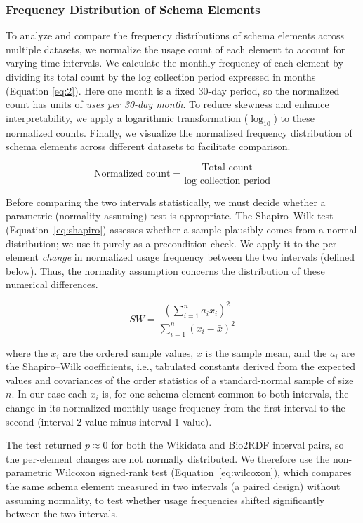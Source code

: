 \documentclass[sw]{iosart2x}
\begin{document}
\subsubsection{Frequency Distribution of Schema Elements}\label{sec:s61}
To analyze and compare the frequency distributions of schema elements across multiple datasets, we normalize the usage count of each element to account for varying time intervals. We calculate the monthly frequency of each element by dividing its total count by the log collection period expressed in months (Equation \ref{eq:2}). Here one month is a fixed 30-day period, so the normalized count has units of \emph{uses per 30-day month}. To reduce skewness and enhance interpretability, we apply a logarithmic transformation ($\log_{10}$) to these normalized counts. Finally, we visualize the normalized frequency distribution of schema elements across different datasets to facilitate comparison.

\begin{equation}
\text{Normalized count} = \frac{\text{Total count}}{\text{log collection period}}
\label{eq:2}
\end{equation}

Before comparing the two intervals statistically, we must decide whether a parametric (normality-assuming) test is appropriate. The Shapiro--Wilk test (Equation~\ref{eq:shapiro}) assesses whether a sample plausibly comes from a normal distribution; we use it purely as a precondition check. We apply it to the per-element \emph{change} in normalized usage frequency between the two intervals (defined below). Thus, the normality assumption concerns the distribution of these numerical differences.

\begin{equation}
SW = \frac{\left( \sum_{i=1}^n a_i x_i \right)^2}{\sum_{i=1}^n (x_i - \bar{x})^2}
\label{eq:shapiro}
\end{equation}

where the \( x_i \) are the ordered sample values, \( \bar{x} \) is the sample mean, and the \( a_i \) are the Shapiro--Wilk coefficients, i.e., tabulated constants derived from the expected values and covariances of the order statistics of a standard-normal sample of size \( n \). In our case each \( x_i \) is, for one schema element common to both intervals, the change in its normalized monthly usage frequency from the first interval to the second (interval-2 value minus interval-1 value).


The test returned $p \approx 0$ for both the Wikidata and Bio2RDF interval pairs, so the per-element changes are not normally distributed. We therefore use the non-parametric Wilcoxon signed-rank test (Equation~\ref{eq:wilcoxon}), which compares the same schema element measured in two intervals (a paired design) without assuming normality, to test whether usage frequencies shifted significantly between the two intervals.
\end{document}
